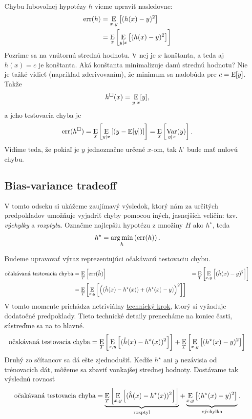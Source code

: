 Chybu ľubovoľnej hypotézy $h$ vieme upraviť nasledovne:
\begin{align}
  \err(h)
    &= \E_{x,y} \left[ (h(x) - y)^2 \right] \\
    &= \E_{x} \left[ \E_{y|x} \left[ (h(x) - y)^2 \right] \right]
\end{align}
Pozrime sa na vnútornú strednú hodnotu. V nej je $x$ konštanta, a
teda aj $h(x) = c$ je konštanta. Aká konštanta minimalizuje danú
strednú hodnotu? Nie je ťažké vidieť (napríklad zderivovaním), že
minimum sa nadobúda pre $c = \E[y]$. Takže
$$h^{\square}(x) = \E_{y|x}[y],$$
a jeho testovacia chyba je
$$\err(h^{\square}) = \E_{x} \left[ \E_{y|x} \left[ (y - \E[y]) \right] \right] = \E_{x} \left[ \Var_{y|x}(y) \right].$$
Vidíme teda, že pokiaľ je $y$ jednoznačne určené $x$-om, tak
$h^{\square}$ bude mať nulovú chybu.



\subsection{Bias-variance tradeoff}
V tomto odseku si ukážeme zaujímavý výsledok, ktorý nám za určitých
predpokladov umožňuje vyjadriť chyby pomocou iných, jasnejších veličín:
tzv. \emph{výchylky} a \emph{rozptylu}.
Označme najlepšiu hypotézu z množiny $H$ ako $h^\star$, teda
$$h^\star = \argmin_h \left( \err(h) \right).$$

Budeme upravovať výraz reprezentujúci očakávanú testovaciu chybu.
\begin{align}
  \chalg
    &= \E_T \left[ \err(\hat{h}) \right]
    &= \E_T \left[ \E_{x,y} \left[ (\hat{h}(x) - y)^2 \right] \right] \\
    &= \E_T \left[ \E_{x,y} \left[ \left( (\hat{h}(x) - h^\star(x)) + (h^\star(x) - y) \right)^2 \right] \right]
\end{align}
V tomto momente prichádza netriviálny \hyperref[tradeoff:tech]{technický krok},
ktorý si vyžaduje dodatočné predpoklady. Tieto technické detaily prenecháme
na koniec časti, sústreďme sa na to hlavné.
$$
  \chalg
    = \E_T \left[ \E_{x,y} \left[ (\hat{h}(x) - h^\star(x))^2 \right] \right]
    + \E_T \left[ \E_{x,y} \left[ (h^\star(x) - y)^2 \right] \right]
$$
Druhý zo sčítancov sa dá ešte zjednodušiť. Kedže $h^\star$ ani $y$
nezávisia od trénovacích dát, môžeme sa zbaviť vonkajšej strednej
hodnoty. Dostávame tak výslednú rovnosť
$$
  \chalg
    = \underbrace{\E_T \left[ \E_{x,y} \left[ (\hat{h}(x) - h^\star(x))^2 \right] \right]}_{\text{rozptyl}}
    + \underbrace{\E_{x,y} \left[ (h^\star(x) - y)^2 \right]}_{\text{výchylka}}.
$$

